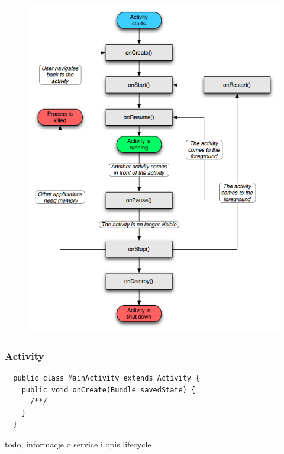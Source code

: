 \documentclass{beamer}
\begin{document}
\begin{frame}
 \begin{figure}[ct]
  \centering
  \includegraphics[height=\textheight]{images/activity_lifecycle}
 \end{figure}

\end{frame}

\begin{frame}[fragile]
\frametitle{Activity}
\begin{lstlisting}
  public class MainActivity extends Activity {
    public void onCreate(Bundle savedState) {
      /**/
    }
  }
\end{lstlisting}

\end{frame}

\begin{frame}
 todo, informacje o service i opis lifecycle
\end{frame}
\end{document}
